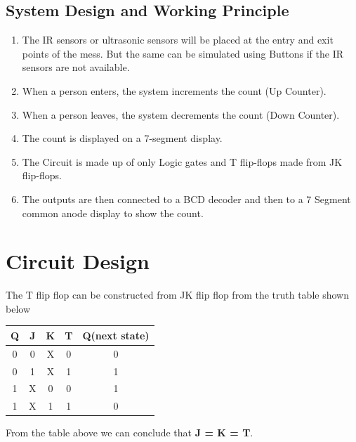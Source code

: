 \documentclass[a4paper,12pt]{article}
\begin{document}
\subsection{System Design and Working Principle}
\begin{enumerate}
    \item The IR sensors or ultrasonic sensors will be placed at the entry and exit points of the mess. But the same can be simulated using Buttons if the IR sensors are not available.
    \item When a person enters, the system increments the count (Up Counter).
    \item When a person leaves, the system decrements the count (Down Counter).
    \item The count is displayed on a 7-segment display.
    \item The Circuit is made up of only Logic gates and T flip-flops made from JK flip-flops.
    \item The outputs are then connected to a BCD decoder and then to a 7 Segment common anode display to show the count.
\end{enumerate}
\section{Circuit Design}
The T flip flop can be constructed from JK flip flop from the truth table shown below
\begin{table}[H]
\centering
\begin{tabular}{|c|c|c|c|c|}
\hline
	\textbf{Q} & \textbf{J} & \textbf{K} & \textbf{T} & \textbf{Q(next state)} \\
\hline
	0 & 0 & X & 0 & 0 \\
\hline
	0 & 1 & X & 1 & 1\\
\hline
	1 & X & 0 & 0 & 1 \\
\hline
	1 & X & 1 & 1 & 0 \\
\hline
\end{tabular}
\end{table}
From the table above we can conclude that \textbf{J = K = T}.
\newpage
\end{document}
